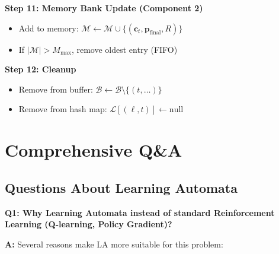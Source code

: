 \documentclass[11pt]{article}
\begin{document}
\textbf{Step 11: Memory Bank Update (Component 2)}
\begin{itemize}
    \item Add to memory: $\mathcal{M} \leftarrow \mathcal{M} \cup \{(\mathbf{c}_t, \mathbf{p}_{\text{final}}, R)\}$
    \item If $|\mathcal{M}| > M_{\text{max}}$, remove oldest entry (FIFO)
\end{itemize}

\textbf{Step 12: Cleanup}
\begin{itemize}
    \item Remove from buffer: $\mathcal{B} \leftarrow \mathcal{B} \setminus \{(t, \ldots)\}$
    \item Remove from hash map: $\mathcal{L}[(\ell, t)] \leftarrow \text{null}$
\end{itemize}

\section{Comprehensive Q\&A}

\subsection{Questions About Learning Automata}

\textbf{Q1: Why Learning Automata instead of standard Reinforcement Learning (Q-learning, Policy Gradient)?}

\textbf{A:} Several reasons make LA more suitable for this problem:
\end{document}
